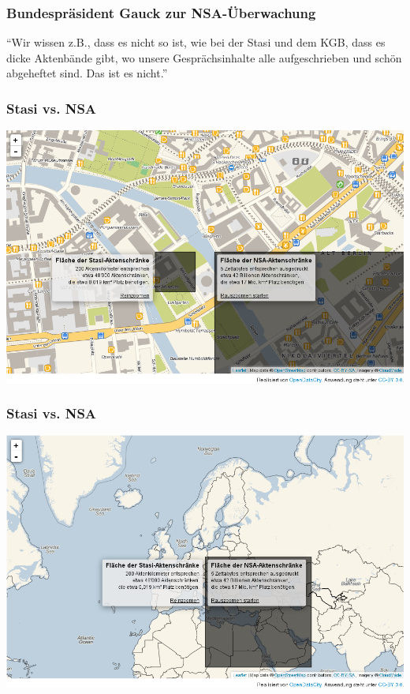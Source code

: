 \documentclass[12pt]{beamer}
\begin{document}


\begin{frame}
    \frametitle{Bundespräsident Gauck zur NSA-Überwachung}
    \begin{center}
      "`Wir wissen z.B., dass es nicht so ist, wie bei der Stasi und dem KGB, dass es dicke Aktenbände gibt, wo unsere Gesprächsinhalte alle aufgeschrieben und schön abgeheftet sind. Das ist es nicht."'
      \end{center}
\end{frame}

\begin{frame}
    \frametitle{Stasi vs. NSA}
    \includegraphics[height=0.7\textheight]{img/akten1.png}
\end{frame}

\begin{frame}
    \frametitle{Stasi vs. NSA}
    \includegraphics[height=0.7\textheight]{img/akten2.png}
\end{frame}
\end{document}
